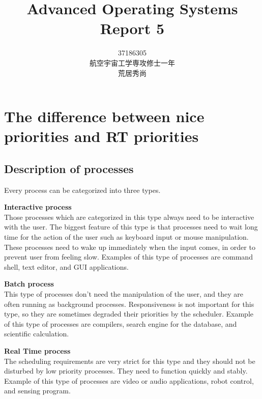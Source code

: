 \documentclass[10pt,a4paper]{ltjsarticle}       %
\title{Advanced Operating Systems\\ Report 5}
\author{37186305\\航空宇宙工学専攻修士一年\\荒居秀尚}
\begin{document}
\maketitle
\section{The difference between nice priorities and RT priorities}
\subsection{Description of processes}
Every process can be categorized into three types.
\begin{description}
\item {\bf Interactive process}\\
Those processes which are categorized in this type always need to be interactive with the user. The biggest feature of this type is that processes need to wait long time for the action of the user such as keyboard input or mouse manipulation. These processes need to wake up immediately when the input comes, in order to prevent user from feeling slow. Examples of this type of processes are command shell, text editor, and GUI applications.
\item {\bf Batch process}\\
This type of processes don't need the manipulation of the user, and they are often running as background processes. Responsiveness is not important for this type, so they are sometimes degraded their priorities by the scheduler. Example of this type of processes are compilers, search engine for the database, and scientific calculation.
\item {\bf Real Time process}\\
The scheduling requirements are very strict for this type and they should not be disturbed by low priority processes. They need to function quickly and stably. Example of this type of processes are video or audio applications, robot control, and sensing program.
\end{description}
\end{document}

